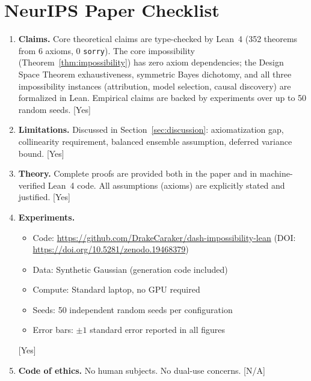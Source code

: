 \documentclass{article}
\begin{document}



\newpage
\section*{NeurIPS Paper Checklist}

\begin{enumerate}
\item \textbf{Claims.} Core theoretical claims are type-checked by Lean~4 (352 theorems from 6 axioms, 0 \texttt{sorry}). The core impossibility (Theorem~\ref{thm:impossibility}) has zero axiom dependencies; the Design Space Theorem exhaustiveness, symmetric Bayes dichotomy, and all three impossibility instances (attribution, model selection, causal discovery) are formalized in Lean. Empirical claims are backed by experiments over up to 50 random seeds. [Yes]

\item \textbf{Limitations.} Discussed in Section~\ref{sec:discussion}: axiomatization gap, collinearity requirement, balanced ensemble assumption, deferred variance bound. [Yes]

\item \textbf{Theory.} Complete proofs are provided both in the paper and in machine-verified Lean~4 code. All assumptions (axioms) are explicitly stated and justified. [Yes]

\item \textbf{Experiments.}
  \begin{itemize}
    \item Code: \url{https://github.com/DrakeCaraker/dash-impossibility-lean} (DOI: \url{https://doi.org/10.5281/zenodo.19468379})
    \item Data: Synthetic Gaussian (generation code included)
    \item Compute: Standard laptop, no GPU required
    \item Seeds: 50 independent random seeds per configuration
    \item Error bars: $\pm 1$ standard error reported in all figures
  \end{itemize}
  [Yes]

\item \textbf{Code of ethics.} No human subjects. No dual-use concerns. [N/A]
\end{enumerate}
\end{document}
